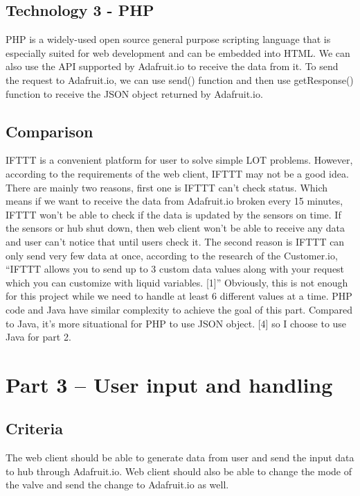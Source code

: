 \documentclass[10pt,onecolumn,journal,draftclsnofoot]{IEEEtran}
\begin{document}
	\subsection{Technology 3 - PHP}
    \par 
  	PHP is a widely-used open source general purpose scripting language that is especially suited for web development and can be embedded into HTML. We can also use the API supported by Adafruit.io to receive the data from it. To send the request to Adafruit.io, we can use send() function and then use getResponse() function to receive the JSON object returned by Adafruit.io.
    \subsection{Comparison}
    \par 
    IFTTT is a convenient platform for user to solve simple LOT problems. However, according to the requirements of the web client, IFTTT may not be a good idea. There are mainly two reasons, first one is IFTTT can’t check status. Which means if we want to receive the data from Adafruit.io broken every 15 minutes, IFTTT won’t be able to check if the data is updated by the sensors on time. If the sensors or hub shut down, then web client won’t be able to receive any data and user can’t notice that until users check it. The second reason is IFTTT can only send very few data at once, according to the research of the Customer.io, “IFTTT allows you to send up to 3 custom data values along with your request which you can customize with liquid variables. [1]” Obviously, this is not enough for this project while we need to handle at least 6 different values at a time. PHP code and Java have similar complexity to achieve the goal of this part. Compared to Java, it’s more situational for PHP to use JSON object. [4] so I choose to use Java for part 2.

    \section{Part 3 – User input and handling}
	\subsection{Criteria}
	\par 
	The web client should be able to generate data from user and send the input data to hub through Adafruit.io. Web client should also be able to change the mode of the valve and send the change to Adafruit.io as well.
	
\end{document}
